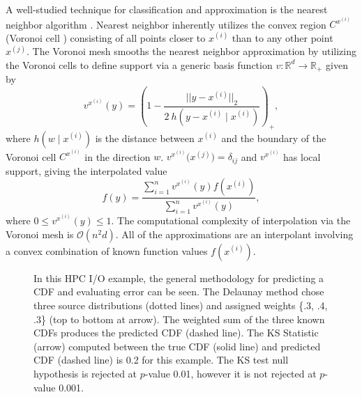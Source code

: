\documentclass[smallextended]{svjour3}       %
\begin{document}
A well-studied technique for classification and approximation is the nearest neighbor algorithm \cite{cover1967nearest}. Nearest neighbor inherently utilizes the convex region $C^{x^{(i)}}$ (Voronoi cell \cite{dirichlet1850reduction}) consisting of all points closer to $x^{(i)}$ than to any other point $x^{(j)}$. The Voronoi mesh smooths the nearest neighbor approximation by utilizing the Voronoi cells to define support via a generic basis function $v: \mathbb{R}^d \rightarrow \mathbb{R}_+$ given by
$$ v^{x^{(i)}}(y) = \left(1 - \frac{||y - x^{(i)}||_2}{2 \ h(y - x^{(i)} \mid x^{(i)})} \right)_+, $$
where $h(w \mid x^{(i)})$ is the distance between $x^{(i)}$ and the boundary of the Voronoi cell $C^{x^{(i)}}$ in the direction $w$. $v^{x^{(i)}}\bigl(x^{(j)}\bigr) = \delta_{ij}$ and $v^{x^{(i)}}$ has local support, giving the interpolated value
$$ f(y) = \frac{\sum\limits_{i=1}^n v^{x^{(i)}}(y) f(x^{(i)})}{\sum\limits_{i=1}^n v^{x^{(i)}}(y)}, $$
where $0 \leq v^{x^{(i)}}(y) \leq 1$. The computational complexity of interpolation via the Voronoi mesh is $\mathcal{O}(n^2 d)$. All of the approximations are an interpolant involving a convex combination of known function values $f(x^{(i)})$.

\begin{figure}[htb]
  \vspace{-0.3cm}
  \caption{In this HPC I/O example, the general methodology for predicting a CDF and evaluating error can be seen. The Delaunay method chose three source distributions (dotted lines) and assigned weights \{.3, .4, .3\} (top to bottom at arrow). The weighted sum of the three known CDFs produces the predicted CDF (dashed line). The KS Statistic (arrow) computed between the true CDF (solid line) and predicted CDF (dashed line) is 0.2 for this example. The KS test null hypothesis is rejected at $p$-value 0.01, however it is not rejected at $p$-value 0.001.
  \vspace{-.1cm}}
  \label{fig:prediction_example}
\end{figure}
\end{document}
